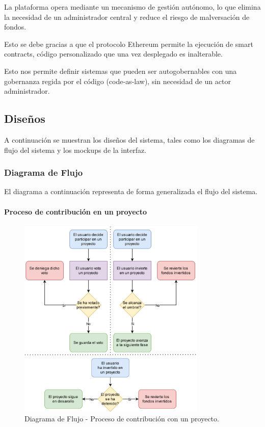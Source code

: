 \bigskip

La plataforma opera mediante un mecanismo de gestión autónomo, lo que elimina la necesidad de un administrador central y reduce el riesgo de malversación de fondos.

\bigskip

Esto se debe gracias a que el protocolo Ethereum permite la ejecución de smart contracts, código personalizado que una vez desplegado es inalterable.

\bigskip

Esto nos permite definir sistemas que pueden ser autogobernables con una gobernanza regida por el código (code-as-law), sin necesidad de un actor administrador.

\newpage

\subsection{Diseños}

A continuación se muestran los diseños del sistema, tales como los diagramas de flujo del sistema y los mockups de la interfaz.

\subsubsection{Diagrama de Flujo}

El diagrama a continuación representa de forma generalizada el flujo del sistema.

\paragraph{Proceso de contribución en un proyecto}
\begin{figure}[H]
        \centering
        \includegraphics[width=0.8\textwidth]{img/diagramas/diagrama_flujo_votante.png}
        \caption{Diagrama de Flujo - Proceso de contribución con un proyecto.}
        \label{fig:configApi}
\end{figure}



